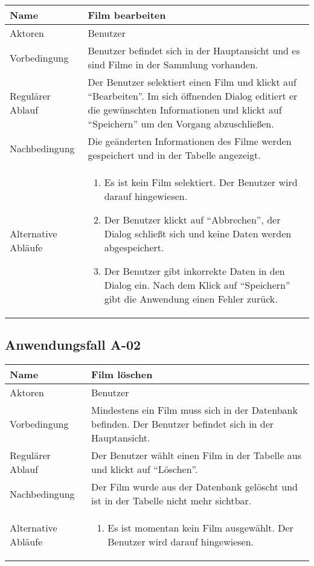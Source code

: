 \documentclass[oneside,german,oneside]{scrbook}
\begin{document}
      \begin{tabular}{|b|p{10cm}|}
        \hline
        Name & Film bearbeiten \\
        \hline
        Aktoren & Benutzer \\
        \hline
        \hline
        Vorbedingung & Benutzer befindet sich in der Hauptansicht und es
        sind Filme in der Sammlung vorhanden.\\
        \hline
        Regul\"arer Ablauf & Der Benutzer selektiert einen Film und klickt auf
        ``Bearbeiten''. Im sich \"offnenden Dialog editiert er die gew\"unschten
        Informationen und klickt auf ``Speichern'' um den Vorgang abzuschließen. \\
        \hline
        Nachbedingung & Die ge\"anderten Informationen des Filme werden gespeichert
        und in der Tabelle angezeigt.\\
        \hline
        Alternative Abl\"aufe &
        \begin{enumerate}
          \item Es ist kein Film selektiert. Der Benutzer wird darauf hingewiesen.
          \item Der Benutzer klickt auf ``Abbrechen'', der Dialog schlie{\ss}t sich
          und keine Daten werden abgespeichert.
          \item Der Benutzer gibt inkorrekte Daten in den Dialog ein. Nach dem
          Klick auf ``Speichern'' gibt die Anwendung einen Fehler zur\"uck.
        \end{enumerate}
        \\
        \hline
      \end{tabular}

    \subsection{Anwendungsfall A-02}\label{uc:02}

      \begin{tabular}{|b|p{10cm}|}
        \hline
        Name & Film l\"oschen \\
        \hline
        Aktoren & Benutzer \\
        \hline
        \hline
        Vorbedingung & Mindestens ein Film muss sich in der Datenbank befinden.
        Der Benutzer befindet sich in der Hauptansicht.\\
        \hline
        Regul\"arer Ablauf & Der Benutzer w\"ahlt einen Film in der Tabelle aus und
        klickt auf ``L\"oschen''.\\
        \hline
        Nachbedingung & Der Film wurde aus der Datenbank gel\"oscht und ist in
        der Tabelle nicht mehr sichtbar.\\
        \hline
        Alternative Abl\"aufe &
        \begin{enumerate}
          \item Es ist momentan kein Film ausgew\"ahlt. Der Benutzer wird darauf
          hingewiesen.
        \end{enumerate}
        \\
        \hline
      \end{tabular}
\end{document}
